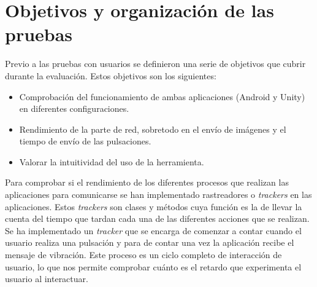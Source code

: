 \begin{figure}[!ht]
     \hfill
     \label{fig:quinta}
   \end{figure}


\section{Objetivos y organizaci\'on de las pruebas}

Previo a las pruebas con usuarios se definieron una serie de objetivos que cubrir durante la evaluaci\'on. Estos objetivos son los siguientes:

\begin {itemize}
\item Comprobaci\'on del funcionamiento de ambas aplicaciones (Android y Unity) en diferentes configuraciones.
\item Rendimiento de la parte de red, sobretodo en el env\'io de im\'agenes y el tiempo de env\'io de las pulsaciones.
\item Valorar la intuitividad del uso de la herramienta.
\end {itemize}

Para comprobar si el rendimiento de los diferentes procesos que realizan las aplicaciones para comunicarse se han implementado rastreadores o \textit{trackers} en las aplicaciones. Estos \textit{trackers} son clases y m\'etodos cuya funci\'on es la de llevar la cuenta del tiempo que tardan cada una de las diferentes acciones que se realizan. Se ha implementado un \textit{tracker} que se encarga de comenzar a contar cuando el usuario realiza una pulsaci\'on y para de contar una vez la aplicaci\'on recibe el mensaje de vibraci\'on. Este proceso es un ciclo completo de interacci\'on de usuario, lo que nos permite comprobar cu\'anto es el retardo que experimenta el usuario al interactuar.\\

